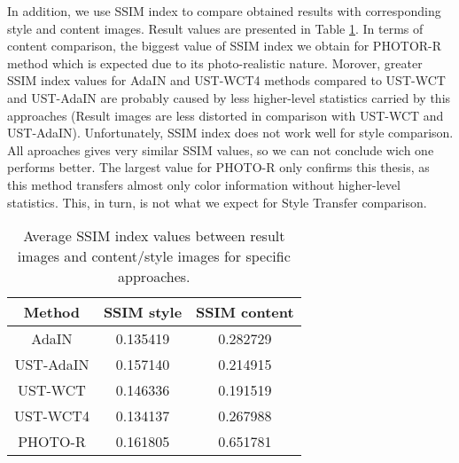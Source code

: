 \documentclass{llncs}
\begin{document}
In addition, we use SSIM index \cite{ssim:} to compare obtained results with corresponding style and content images. Result values are presented in Table \ref{ssim:results}. In terms of content comparison, the biggest value of SSIM index we obtain for PHOTOR-R method which is expected due to its photo-realistic nature. Morover, greater SSIM index values for AdaIN and UST-WCT4 methods compared to UST-WCT and UST-AdaIN are probably caused by less higher-level statistics carried by this approaches (Result images are less distorted in comparison with UST-WCT and UST-AdaIN). Unfortunately, SSIM index does not work well for style comparison. All aproaches gives very similar SSIM values, so we can not conclude wich one performs better. The largest value for PHOTO-R only confirms this thesis, as this method transfers almost only color information without higher-level statistics. This, in turn, is not what we expect for Style Transfer comparison.


\begin{table}[H]
\centering
\bgroup
\def\arraystretch{1.1}
\setlength\tabcolsep{2.6em}
\caption{Average SSIM index values between result images and content/style images for specific approaches. \label{ssim:results}}
\begin{tabular}{| c | c | c |}
\hline
Method&SSIM style&SSIM content\\
\hline
AdaIN&0.135419&0.282729\\
\hline

UST-AdaIN&0.157140&0.214915\\
\hline

UST-WCT&0.146336&0.191519\\
\hline

UST-WCT4&0.134137&0.267988\\
\hline

PHOTO-R&0.161805&0.651781\\
\hline

\end{tabular}

\egroup
\vspace{-8mm}
\end{table}
\end{document}

